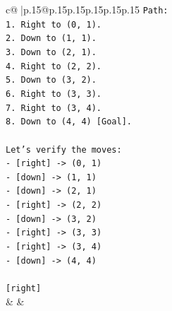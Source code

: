 \documentclass{article}
\begin{document}
{\begin{supertabular}{c@{$\;$}|p{.15\linewidth}@{}p{.15\linewidth}p{.15\linewidth}p{.15\linewidth}p{.15\linewidth}p{.15\linewidth}}
{{{\texttt{Path:} \\
\texttt{1. Right to (0, 1).} \\
\texttt{2. Down to (1, 1).} \\
\texttt{3. Down to (2, 1).} \\
\texttt{4. Right to (2, 2).} \\
\texttt{5. Down to (3, 2).} \\
\texttt{6. Right to (3, 3).} \\
\texttt{7. Right to (3, 4).} \\
\texttt{8. Down to (4, 4) {[}Goal{]}.} \\
\\ 
\texttt{Let's verify the moves:} \\
\texttt{{-} {[}right{]} {-}> (0, 1)} \\
\texttt{{-} {[}down{]} {-}> (1, 1)} \\
\texttt{{-} {[}down{]} {-}> (2, 1)} \\
\texttt{{-} {[}right{]} {-}> (2, 2)} \\
\texttt{{-} {[}down{]} {-}> (3, 2)} \\
\texttt{{-} {[}right{]} {-}> (3, 3)} \\
\texttt{{-} {[}right{]} {-}> (3, 4)} \\
\texttt{{-} {[}down{]} {-}> (4, 4)} \\
\\ 
\texttt{{[}right{]}} \\
            }
        }
    }
    & & \\ \\


\end{supertabular}}
\end{document}
